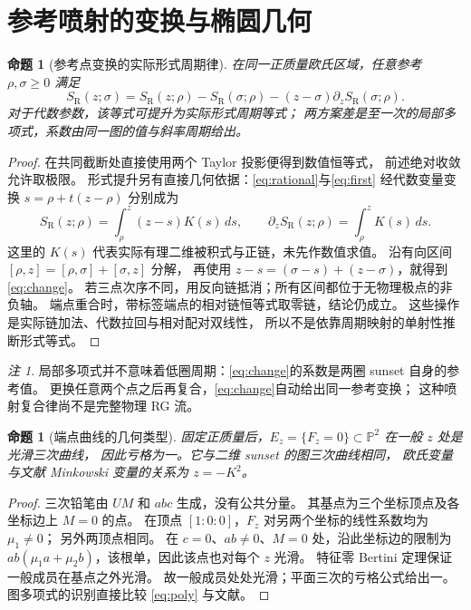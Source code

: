 \documentclass[11pt,a4paper]{ctexart}
\theoremstyle{cnplain}
\newtheorem{proposition}[theorem]{命题}
\theoremstyle{remark}\newtheorem{remark}[theorem]{注}
\newcommand{\PP}{\mathbb P}
\newcommand{\SR}{S_{\mathrm R}}
\begin{document}
\section{参考喷射的变换与椭圆几何}
\begin{proposition}[参考点变换的实际形式周期律]\label{prop:reference}
在同一正质量欧氏区域，任意参考 $\rho,\sigma\geq0$ 满足
\begin{equation}\label{eq:change}
 \SR(z;\sigma)=\SR(z;\rho)-\SR(\sigma;\rho)
                -(z-\sigma)\partial_z\SR(\sigma;\rho).
\end{equation}
对于代数参数，该等式可提升为实际形式周期等式；
两方案差是至一次的局部多项式，系数由同一图的值与斜率周期给出。
\end{proposition}
\begin{proof}
在共同截断处直接使用两个 Taylor 投影便得到数值恒等式，
前述绝对收敛允许取极限。
形式提升另有直接几何依据：\eqref{eq:rational}与\eqref{eq:first}
经代数变量变换 $s=\rho+t(z-\rho)$ 分别成为
\begin{equation}\label{eq:weighted}
 \SR(z;\rho)=\int_\rho^z(z-s)K(s)\,ds,\qquad
 \partial_z\SR(z;\rho)=\int_\rho^zK(s)\,ds.
\end{equation}
这里的 $K(s)$ 代表实际有理二维被积式与正链，未先作数值求值。
沿有向区间 $[\rho,z]=[\rho,\sigma]+[\sigma,z]$ 分解，
再使用 $z-s=(\sigma-s)+(z-\sigma)$，就得到 \eqref{eq:change}。
若三点次序不同，用反向链抵消；所有区间都位于无物理极点的非负轴。
端点重合时，带标签端点的相对链恒等式取零链，结论仍成立。
这些操作是实际链加法、代数拉回与相对配对双线性，
所以不是依靠周期映射的单射性推断形式等式。
\end{proof}

\begin{remark}
局部多项式并不意味着低圈周期：\eqref{eq:change}的系数是两圈 sunset 自身的参考值。
更换任意两个点之后再复合，\eqref{eq:change}自动给出同一参考变换；
这种喷射复合律尚不是完整物理 RG 流。
\end{remark}

\begin{proposition}[端点曲线的几何类型]\label{prop:elliptic}
固定正质量后，$E_z=\{F_z=0\}\subset\PP^2$ 在一般 $z$ 处是光滑三次曲线，
因此亏格为一。它与二维 sunset 的图三次曲线相同，
欧氏变量与文献 Minkowski 变量的关系为 $z=-K^2$。
\end{proposition}
\begin{proof}
三次铅笔由 $UM$ 和 $abc$ 生成，没有公共分量。
其基点为三个坐标顶点及各坐标边上 $M=0$ 的点。
在顶点 $[1:0:0]$，$F_z$ 对另两个坐标的线性系数均为 $\mu_1\ne0$；
另外两顶点相同。
在 $c=0$、$ab\ne0$、$M=0$ 处，沿此坐标边的限制为
$ab(\mu_1a+\mu_2b)$，该根单，因此该点也对每个 $z$ 光滑。
特征零 Bertini 定理保证一般成员在基点之外光滑。
故一般成员处处光滑；平面三次的亏格公式给出一。
图多项式的识别直接比较 \eqref{eq:poly} 与文献\cite[式(2.5)--(2.6)]{BV}。
\end{proof}
\end{document}
